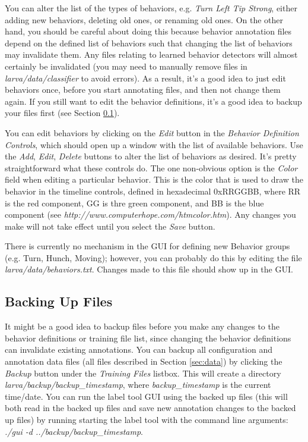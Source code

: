 \documentclass[10pt, onecolumn]{article}
\newcommand{\1}{\textbf{1}}
\begin{document}
You can alter the list of the types of behaviors, e.g. \textit{Turn Left Tip Strong}, either adding new behaviors, deleting old ones, or renaming old ones.  On the other hand, you should be careful about doing this because behavior annotation files depend on the defined list of behaviors such that changing the list of behaviors may invalidate them.  Any files relating to learned behavior detectors will almost certainly be invalidated (you may need to manually remove files in \textit{larva/data/classifier} to avoid errors).  As a result, it's a good idea to just edit behaviors once, before you start annotating files, and then not change them again.  If you still want to edit the behavior definitions, it's a good idea to backup your files first (see Section \ref{sec:backup}).

You can edit behaviors by clicking on the \textit{Edit} button in the \textit{Behavior Definition Controls}, which should open up a window with the list of available behaviors.  Use the \textit{Add}, \textit{Edit}, \textit{Delete} buttons to alter the list of behaviors as desired.  It's pretty straightforward what these controls do.  The one non-obvious option is the \textit{Color} field when editing a particular behavior.  This is the color that is used to draw the behavior in the timeline controls, defined in hexadecimal 0xRRGGBB, where RR is the red component, GG is thre green component, and BB is the blue component (see \textit{http://www.computerhope.com/htmcolor.htm}).  Any changes you make will not take effect until you select the \textit{Save} button.

There is currently no mechanism in the GUI for defining new Behavior groups (e.g. Turn, Hunch, Moving); however, you can probably do this by editing the file \textit{larva/data/behaviors.txt}.  Changes made to this file should show up in the GUI.

\subsection{Backing Up Files}
\label{sec:backup}

It might be a good idea to backup files before you make any changes to the behavior definitions or training file list, since changing the behavior definitions can invalidate existing annotations. You can backup all configuration and annotation data files (all files described in Section \ref{sec:data}) by clicking the \textit{Backup} button under the \textit{Training Files} listbox.  This will create a directory \textit{larva/backup/backup\_timestamp}, where \textit{backup\_timestamp} is the current time/date.  You can run the label tool GUI using the backed up files (this will both read in the backed up files and save new annotation changes to the backed up files) by running starting the label tool with the command line arguments: \textit{./gui -d ../backup/backup\_timestamp}.
\end{document}
